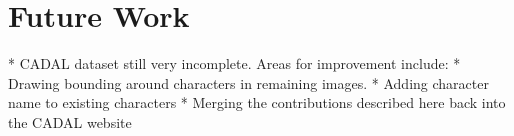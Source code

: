 \chapter{Future Work}


* CADAL dataset still very incomplete.  Areas for improvement include:
    * Drawing bounding around characters in remaining images.
    * Adding character name to existing characters
    * Merging the contributions described here back into the CADAL website
    
